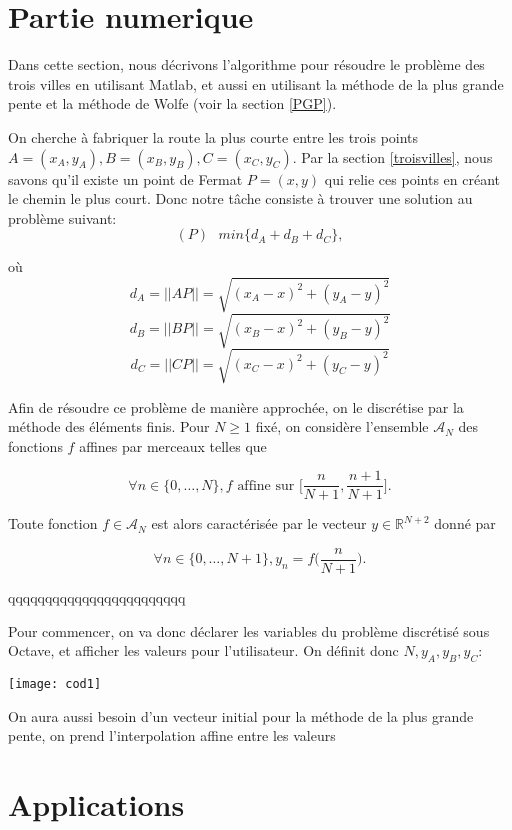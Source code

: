 \documentclass[10pt,a4paper]{article}%
\theoremstyle{theorem}
\theoremstyle{definition}
\begin{document}
	\section{Partie numerique}
	
	Dans cette section, nous décrivons l'algorithme pour résoudre le problème des trois villes en utilisant Matlab, et aussi en utilisant la méthode de la plus grande pente et la méthode de Wolfe (voir la section \ref{PGP}).
	
	On cherche à fabriquer la route la plus courte entre les trois points $A=(x_A,y_A), B=(x_B,y_B), C=(x_C,y_C)$. Par la section \ref{troisvilles}, nous savons qu'il existe un point de Fermat $P=(x,y)$ qui relie ces points en créant le chemin le plus court.
	Donc notre tâche consiste à trouver une solution au problème suivant:
	\[(P) \text{       } min\{d_A+d_B+d_C\},\]
	
	où
	 \[d_A=||AP||=\sqrt{(x_A-x)^2+(y_A-y)^2}\]
	 \[d_B=||BP||=\sqrt{(x_B-x)^2+(y_B-y)^2}\]
	 \[d_C=||CP||=\sqrt{(x_C-x)^2+(y_C-y)^2}\]
	 
	 Afin de résoudre ce problème de manière approchée, on le discrétise par la méthode des éléments finis. Pour $N\ge 1$ fixé, on considère l'ensemble $\mathcal{A}_N$ des fonctions $f$ affines par merceaux telles que 
	 
	 \[\forall n \in \{0,\dots, N\}, f \text{ affine sur } \bigg[\frac{n}{N+1},\frac{n+1}{N+1}\bigg]. \]
	 
	 Toute fonction $f\in \mathcal{A}_N$ est alors caractérisée par le vecteur $y \in \mathbb{R}^{N+2}$  donné par
	 
	 \[\forall n \in \{0,\dots, N+1\}, y_n=f\bigg(\frac{n}{N+1}\bigg).\] 
	 
	 qqqqqqqqqqqqqqqqqqqqqqqq
	 
	 Pour commencer, on va donc déclarer les variables du problème discrétisé sous Octave, et afficher les valeurs pour l'utilisateur. On définit donc $N,y_A,y_B,y_C$:
	 
	 \begin{center}
	 	\texttt{[image: cod1]}
	 \end{center}
	
	On aura aussi besoin d'un vecteur initial pour la méthode de la plus grande pente, on prend l'interpolation affine entre les valeurs 
	
	
	
	
	
	
	
	\section{Applications}
	
\end{document}
